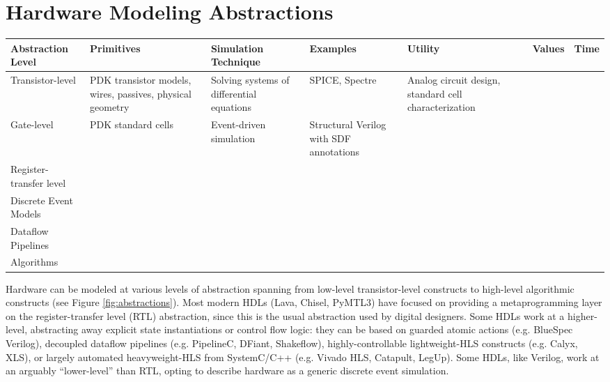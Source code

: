 \documentclass[sigplan,review,nonacm]{acmart}
\begin{document}
\section{Hardware Modeling Abstractions}

\begin{figure*}[!hbt]
\small
\begin{tabular}{p{3cm}p{3cm}p{3cm}p{3cm}p{3cm}p{3cm}p{3cm}}\toprule
\textbf{Abstraction Level} & Primitives & Simulation Technique & Examples & Utility & Values & Time \\\midrule
Transistor-level & PDK transistor models, wires, passives, physical geometry & Solving systems of differential equations & SPICE, Spectre & Analog circuit design, standard cell characterization &  & \\\midrule
Gate-level & PDK standard cells & Event-driven simulation & Structural Verilog with SDF annotations & & & \\\midrule
Register-transfer level & & & & & & \\\midrule
Discrete Event Models & & & & & & \\\midrule
Dataflow Pipelines & & & & & & \\\midrule
Algorithms & & & & & & \\\bottomrule
\end{tabular}
\caption{Overview of different abstraction levels for describing hardware designs and }
\label{fig:abstractions}
\end{figure*}


Hardware can be modeled at various levels of abstraction spanning from low-level transistor-level constructs to high-level algorithmic constructs (see Figure \ref{fig:abstractions}).
Most modern HDLs (Lava, Chisel, PyMTL3) have focused on providing a metaprogramming layer on the register-transfer level (RTL) abstraction, since this is the usual abstraction used by digital designers.
Some HDLs work at a higher-level, abstracting away explicit state instantiations or control flow logic: they can be based on guarded atomic actions (e.g. BlueSpec Verilog), decoupled dataflow pipelines (e.g. PipelineC, DFiant\cite{dfiant}, Shakeflow), highly-controllable lightweight-HLS constructs (e.g. Calyx, XLS), or largely automated heavyweight-HLS from SystemC/C++ (e.g. Vivado HLS, Catapult, LegUp).
Some HDLs, like Verilog, work at an arguably ``lower-level'' than RTL, opting to describe hardware as a generic discrete event simulation.
\end{document}
